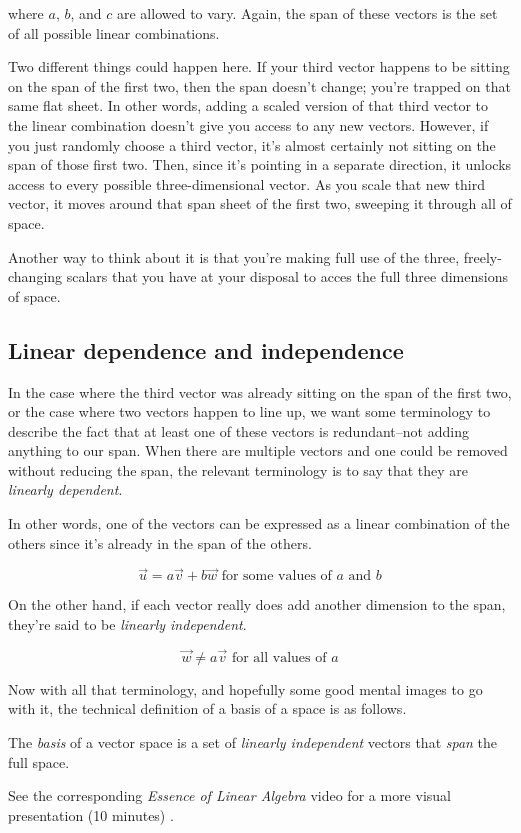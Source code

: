 where $a$, $b$, and $c$ are allowed to vary. Again, the span of these vectors is
the set of all possible linear combinations.

Two different things could happen here. If your third vector happens to be
sitting on the span of the first two, then the span doesn't change; you're
trapped on that same flat sheet. In other words, adding a scaled version of that
third vector to the linear combination doesn't give you access to any new
vectors. However, if you just randomly choose a third vector, it's almost
certainly not sitting on the span of those first two. Then, since it's pointing
in a separate direction, it unlocks access to every possible three-dimensional
vector. As you scale that new third vector, it moves around that span sheet of
the first two, sweeping it through all of space.

Another way to think about it is that you're making full use of the three,
freely-changing scalars that you have at your disposal to acces the full three
dimensions of space.

\subsection{Linear dependence and independence}

In the case where the third vector was already sitting on the span of the first
two, or the case where two vectors happen to line up, we want some terminology
to describe the fact that at least one of these vectors is redundant--not adding
anything to our span. When there are multiple vectors and one could be removed
without reducing the span, the relevant terminology is to say that they are
\textit{linearly dependent}.

In other words, one of the vectors can be expressed as a linear combination of
the others since it's already in the span of the others.

\begin{equation*}
  \vec{u} = a\vec{v} + b\vec{w} \text{ for some values of $a$ and $b$}
\end{equation*}

On the other hand, if each vector really does add another dimension to the span,
they're said to be \textit{linearly independent}.

\begin{equation*}
  \vec{w} \neq a\vec{v} \text{ for all values of $a$}
\end{equation*}

Now with all that terminology, and hopefully some good mental images to go with
it, the technical definition of a basis of a space is as follows.

\begin{definition}
  The \textit{basis} of a vector space is a set of \textit{linearly independent}
  vectors that \textit{span} the full space.
\end{definition}

\begin{remark}
  See the corresponding \textit{Essence of Linear Algebra} video for a more
  visual presentation (10 minutes) \cite{bib:linalg_linear_combinations}.
\end{remark}
